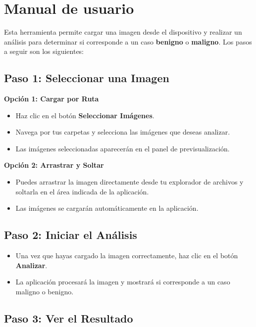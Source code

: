 \documentclass[12pt]{article} %
\begin{document}


\section{Manual de usuario}

Esta herramienta permite cargar una imagen desde el dispositivo y realizar un análisis para determinar si corresponde a un caso \textbf{benigno} o \textbf{maligno}. Los pasos a seguir son los siguientes:

\subsection*{Paso 1: Seleccionar una Imagen}

\textbf{Opción 1: Cargar por Ruta}
\begin{itemize}
    \item Haz clic en el botón \textbf{Seleccionar Imágenes}.
    \item Navega por tus carpetas y selecciona las imágenes que deseas analizar.
    \item Las imágenes seleccionadas aparecerán en el panel de previsualización.
\end{itemize}

\textbf{Opción 2: Arrastrar y Soltar}
\begin{itemize}
    \item Puedes arrastrar la imagen directamente desde tu explorador de archivos y soltarla en el área indicada de la aplicación.
    \item Las imágenes se cargarán automáticamente en la aplicación.
\end{itemize}

\subsection*{Paso 2: Iniciar el Análisis}

\begin{itemize}
    \item Una vez que hayas cargado la imagen correctamente, haz clic en el botón \textbf{Analizar}.
    \item La aplicación procesará la imagen y mostrará si corresponde a un caso maligno o benigno.
\end{itemize}

\subsection*{Paso 3: Ver el Resultado}
\end{document}
